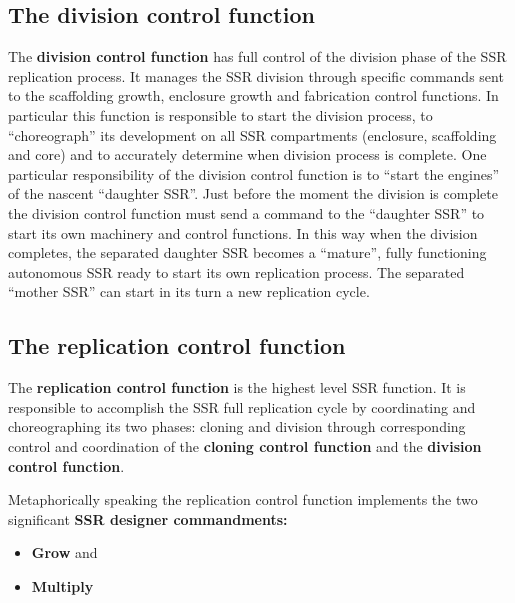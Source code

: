 \bigskip

\subsection[The division control function]{The division control
function}
\hypertarget{RefHeading3102306210128}{}The \textbf{division control
function} has full control of the division phase of the SSR replication
process. It manages the SSR division through specific commands sent to
the scaffolding growth, enclosure growth and fabrication control
functions.  In particular this function is responsible to start the
division process, to “choreograph” its development on all SSR
compartments (enclosure, scaffolding and core) and to accurately
determine when division process is complete. One particular
responsibility of the division control function is to “start the
engines” of the nascent “daughter SSR”. Just before the moment the
division is complete the division control function must send a command
to the “daughter SSR” to start its own machinery and control functions.
In this way when the division completes, the separated daughter SSR
becomes a “mature”, fully functioning autonomous SSR ready to start its
own replication process. The separated “mother SSR” can start in its
turn a new replication cycle.


\bigskip

\subsection[The replication control function]{The replication control
function}
\hypertarget{RefHeading3104306210128}{}The \textbf{replication control
function} is the highest level SSR function. It is responsible to
accomplish the SSR full replication cycle by coordinating and
choreographing its two phases: cloning and division through
corresponding control and coordination of the \textbf{cloning control
function} and the \textbf{division control function}.


\bigskip

 Metaphorically speaking the replication control function implements the
two significant \textbf{SSR designer commandments:}


\bigskip

\begin{itemize}
\item \textbf{Grow} and
\item \textbf{Multiply}
\end{itemize}


